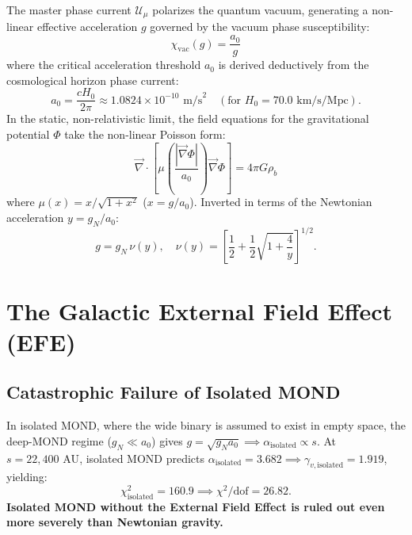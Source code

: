 \documentclass[11pt,a4paper]{article}
\begin{document}
The master phase current $\mathcal{U}_\mu$ polarizes the quantum vacuum, generating a non-linear effective acceleration $g$ governed by the vacuum phase susceptibility:
\begin{equation}
\chi_{\mathrm{vac}}(g) = \frac{a_0}{g}
\end{equation}
where the critical acceleration threshold $a_0$ is derived deductively from the cosmological horizon phase current:
\begin{equation}
a_0 = \frac{c H_0}{2\pi} \approx 1.0824 \times 10^{-10}\text{ m/s}^2 \quad (\text{for } H_0 = 70.0\text{ km/s/Mpc}).
\end{equation}
In the static, non-relativistic limit, the field equations for the gravitational potential $\Phi$ take the non-linear Poisson form:
\begin{equation}
\vec{\nabla} \cdot \left[ \mu\left(\frac{|\vec{\nabla}\Phi|}{a_0}\right) \vec{\nabla}\Phi \right] = 4\pi G \rho_b
\end{equation}
where $\mu(x) = x/\sqrt{1 + x^2}$ ($x = g/a_0$). Inverted in terms of the Newtonian acceleration $y = g_N / a_0$:
\begin{equation}
g = g_N \, \nu(y), \quad \nu(y) = \left[ \frac{1}{2} + \frac{1}{2}\sqrt{1 + \frac{4}{y}} \right]^{1/2}.
\end{equation}

\section{The Galactic External Field Effect (EFE)}

\subsection{Catastrophic Failure of Isolated MOND}
In isolated MOND, where the wide binary is assumed to exist in empty space, the deep-MOND regime ($g_N \ll a_0$) gives $g = \sqrt{g_N a_0} \implies \alpha_{\mathrm{isolated}} \propto s$. At $s = 22,400\text{ AU}$, isolated MOND predicts $\alpha_{\mathrm{isolated}} = 3.682 \implies \gamma_{v,\mathrm{isolated}} = 1.919$, yielding:
\begin{equation}
\chi_{\mathrm{isolated}}^2 = 160.9 \implies \chi^2/\mathrm{dof} = \mathbf{26.82}.
\end{equation}
\textbf{Isolated MOND without the External Field Effect is ruled out even more severely than Newtonian gravity.}
\end{document}

